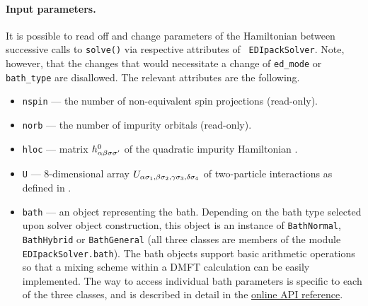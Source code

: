 \documentclass[edipack_sp.tex]{subfiles}
\begin{document}
\paragraph{{\bf Input parameters}.}
It is possible to read off and change parameters of the Hamiltonian between
successive calls to {\tt solve()} via respective attributes of {\tt 
EDIpackSolver}. Note, however, that the changes that would necessitate a change of {\tt ed\_mode} or {\tt bath\_type} are disallowed. The relevant attributes
are the following.
\begin{itemize}
    \item {\tt nspin} --- the number of non-equivalent spin projections 
          (read-only).
    \item {\tt norb} --- the number of impurity orbitals (read-only).
    \item {\tt hloc} --- matrix $h^0_{\alpha\beta\sigma\sigma'}$ of
          the quadratic impurity Hamiltonian .
    \item {\tt U} --- 8-dimensional array $U_{\alpha\sigma_1,\beta\sigma_2,\gamma\sigma_3,\delta\sigma_4}$
          of two-particle interactions as defined in .
    \item {\tt bath} --- an object representing the bath. Depending on the
          bath type selected upon solver object construction, this object is an
          instance of {\tt BathNormal}, {\tt BathHybrid} or {\tt BathGeneral}
          (all three classes are members of the module
          {\tt EDIpackSolver.bath}). The bath objects support basic arithmetic
          operations so that a mixing scheme within a DMFT calculation can be
          easily implemented. The way to access individual bath parameters is
          specific to each of the three classes, and is described in detail in the       \href{https://krivenko.github.io/edipack2triqs/documentation.html\#module-edipack2triqs.bath}{online API reference}.
\end{itemize}
\end{document}
